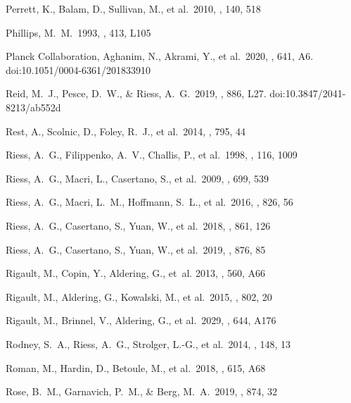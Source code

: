 \documentclass[referee]{aa}
\begin{document}
\begin{thebibliography}{}
 Perrett, K., Balam, D., Sullivan,
M., et al.\ 2010, \aj, 140, 518

 Phillips, M.~M.\ 1993, \apjl, 413, L105

 Planck
Collaboration, Aghanim, N., Akrami, Y., et al.\ 2020, \aap, 641, A6.
doi:10.1051/0004-6361/201833910



 Reid, M.~J., Pesce, D.~W., \& Riess,
A.~G.\ 2019, \apjl, 886, L27. doi:10.3847/2041-8213/ab552d

 Rest, A., Scolnic, D., Foley, R.~J., et
al.\ 2014, \apj, 795, 44

 Riess, A.~G., Filippenko, A.~V.,
Challis, P., et al.\ 1998, \aj, 116, 1009

 Riess, A.~G., Macri, L., Casertano, S.,
et al.\ 2009, \apj, 699, 539

 Riess, A.~G., Macri, L.~M., Hoffmann,
S.~L., et al.\ 2016, \apj, 826, 56

 Riess, A.~G., Casertano, S., Yuan, W.,
et al.\ 2018, \apj, 861, 126

 Riess, A.~G., Casertano, S., Yuan, W.,
et al.\ 2019, \apj, 876, 85

 Rigault, M., Copin, Y.,
Aldering, G., {et~al.} 2013, \aap, 560, A66

 Rigault, M., Aldering, G., Kowalski,
M., et al.\ 2015, \apj, 802, 20

 Rigault, M., Brinnel, V., Aldering,
G., et al.\ 2029, \aap, 644, A176

 Rodney, S.~A., Riess, A.~G., Strolger,
L.-G., et al.\ 2014, \aj, 148, 13 
  
 Roman, M., Hardin, D., Betoule, M., et
al.\ 2018, \aap, 615, A68

 Rose, B.~M., Garnavich, P.~M., \& Berg,
M.~A.\ 2019, \apj, 874, 32


\end{thebibliography}
\end{document}
